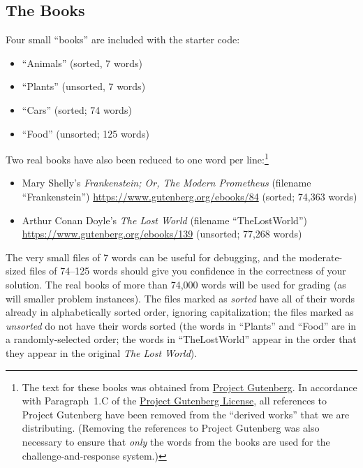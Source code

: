 \subsection*{The Books}

Four small ``books'' are included with the starter code:

\begin{itemize}
    \item ``Animals'' (sorted, 7 words)
    \item ``Plants'' (unsorted, 7 words)
    \item ``Cars'' (sorted; 74 words)
    \item ``Food'' (unsorted; 125 words)
\end{itemize}

Two real books have also been reduced to one word per line:\footnote{The text for these books was obtained from \href{https://www.gutenberg.org/}{Project Gutenberg}. In accordance with Paragraph~1.C of the \href{https://www.gutenberg.org/policy/license}{Project Gutenberg License}, all references to Project Gutenberg have been removed from the ``derived works'' that we are distributing. (Removing the references to Project Gutenberg was also necessary to ensure that \textit{only} the words from the books are used for the challenge-and-response system.)}

\begin{itemize}
    \item Mary Shelly's \textit{Frankenstein; Or, The Modern Prometheus} (filename ``Frankenstein'') \url{https://www.gutenberg.org/ebooks/84} (sorted; 74,363 words)
    \item Arthur Conan Doyle's \textit{The Lost World} (filename ``TheLostWorld'')
    \url{https://www.gutenberg.org/ebooks/139} (unsorted; 77,268 words)
\end{itemize}

The very small files of 7 words can be useful for debugging, and the moderate-sized files of 74--125 words should give you confidence in the correctness of your solution.
The real books of more than 74,000 words will be used for grading (as will smaller problem instances).
The files marked as \textit{sorted} have all of their words already in alphabetically sorted order, ignoring capitalization;
the files marked as \textit{unsorted} do not have their words sorted (the words in ``Plants'' and ``Food'' are in a randomly-selected order;
the words in ``TheLostWorld'' appear in the order that they appear in the original \textit{The Lost World}).

